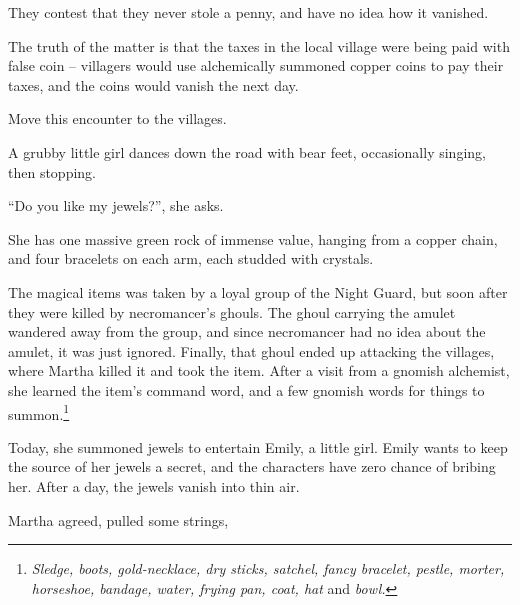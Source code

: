\begin{multicols}{2}
They contest that they never stole a penny, and have no idea how it vanished.

The truth of the matter is that the taxes in the local village were being paid with false coin -- villagers would use alchemically summoned copper coins to pay their taxes, and the coins would vanish the next day.


\humanthief


\humanthief

Move this encounter to the villages.


\begin{boxtext}
	A grubby little girl dances down the road with bear feet, occasionally singing, then stopping.

		``Do you like my jewels?'', she asks.

	She has one massive green rock of immense value, hanging from a copper chain, and four bracelets on each arm, each studded with crystals.
\end{boxtext}

The magical items was taken by a loyal group of the Night Guard, but soon after they were killed by \gls{necromancer}'s ghouls.
The ghoul carrying the amulet wandered away from the group, and since \gls{necromancer} had no idea about the amulet, it was just ignored.
Finally, that ghoul ended up attacking the villages, where Martha killed it and took the item.
After a visit from a gnomish alchemist, she learned the item's command word, and a few gnomish words for things to summon.\footnote{\textit{Sledge, boots, gold-necklace, dry sticks, satchel, fancy bracelet, pestle, morter, horseshoe, bandage, water, frying pan, coat, hat} and \textit{bowl.}}

Today, she summoned jewels to entertain Emily, a little girl.
Emily wants to keep the source of her jewels a secret, and the characters have zero chance of bribing her.
After a day, the jewels vanish into thin air.

Martha agreed, pulled some strings, 




\end{multicols}

